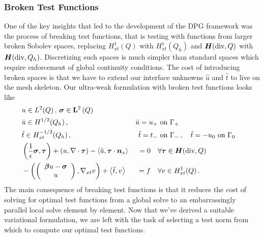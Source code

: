 \documentclass{article}
\begin{document}
\subsubsection{Broken Test Functions}
One of the key insights that led to the development of the DPG framework was the process of breaking test functions, 
that is testing with functions from larger broken Sobolev spaces, replacing $H^1_{xt}(Q)$ with  $H^1_{xt}(Q_h)$ 
and $\mbox{\boldmath $H$}(\text{div},Q)$ with $\mbox{\boldmath $H$}(\text{div},Q_h)$.
Discretizing such spaces is much simpler than standard spaces which require enforcement of global continuity conditions.
The cost of introducing broken spaces is that we have to extend our interface unknowns $\hat u$ and $\hat t$ 
to live on the mesh skeleton. %
Our ultra-weak formulation with broken test functions looks like
\begin{equation}
\label{eq:confusionUltraWeakBrokenBF}
	\begin{aligned}
		&u\in L^2(Q)\,,\,\boldsymbol\sigma\in\mathbf{L}^2\left( Q \right)\\
		&\hat u\in H^{1/2}(Q_h)\,,\,&\hat u=u_+&\text{ on }\Gamma_+\\
		&\hat t\in H^{-1/2}_{xt}(Q_h)\,,\,&\hat t=t_-&\text{ on }\Gamma_-\,,\quad\hat t=-u_0\text{ on }\Gamma_0\\
		&\left( \frac{1}{\epsilon}\boldsymbol\sigma,\boldsymbol\tau \right)+\left( u,\nabla\cdot\boldsymbol\tau \right)-\left\langle \hat u,\boldsymbol\tau\cdot\boldsymbol n_x \right\rangle&=0\quad&\forall\boldsymbol\tau\in\mbox{\boldmath $H$}(\text{div},Q)\\
		&-\left( \left( \begin{array}{c} \boldsymbol\beta u-\boldsymbol\sigma\\ u\\ \end{array} \right),\nabla_{xt} v \right)+\left\langle \hat t,v \right\rangle&=f\quad&\forall v\in H^1_{xt}(Q)\,.
	\end{aligned}
\end{equation}
The main consequence of breaking test functions is that it reduces the cost of solving for optimal test functions from a global solve 
to an embarrassingly parallel local solve element by element.
Now that we've derived a suitable variational formulation, we are left with the task of selecting a test norm from which to compute our optimal test functions.
\end{document}
